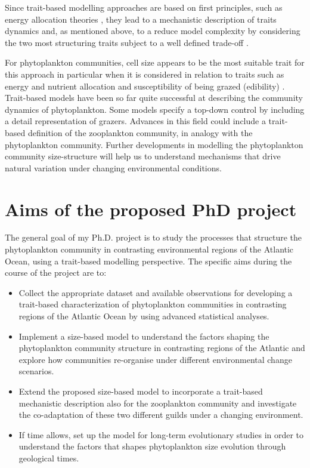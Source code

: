 Since trait-based modelling approaches are based on first principles, such as energy allocation theories \citep{Kooijman2009}, they lead to a mechanistic description of traits dynamics and, as mentioned above, to a reduce model complexity by considering the two most structuring traits subject to a well defined trade-off \citep{Merico2009, Follows2011}.

For phytoplankton communities, cell size appears to be the most suitable trait for this approach in particular when it is considered in relation to traits such as energy and nutrient allocation and susceptibility of being grazed (edibility) \citep{Litchman2008,Follows2011, Merico2009}. Trait-based models \citep{Bruggeman2007, Merico2009} have been so far quite successful at describing the community dynamics of phytoplankton. Some models specify a top-down control by including a detail representation of grazers. Advances in this field could include a trait-based definition of the zooplankton community, in analogy with the phytoplankton community. Further developments in modelling the phytoplankton community size-structure will help us to understand mechanisms that drive natural variation under changing environmental conditions.


\section{Aims of the proposed PhD project}
The general goal of my Ph.D. project is to study the processes that structure the phytoplankton community in contrasting environmental regions of the Atlantic Ocean, using a trait-based modelling perspective. The specific aims during the course of the project are to:

\begin{itemize}
\item Collect the appropriate dataset and available observations for developing a trait-based characterization of phytoplankton communities in contrasting regions of the Atlantic Ocean by using advanced statistical analyses. 
\item Implement a size-based model to understand the factors shaping the phytoplankton community structure in contrasting regions of the Atlantic and explore how communities re-organise under different environmental change scenarios.
\item Extend the proposed size-based model to incorporate a trait-based mechanistic description also for the zooplankton community and investigate the co-adaptation of these two different guilds under a changing environment.
\item If time allows, set up the model for long-term evolutionary studies in order to understand the factors that shapes phytoplankton size evolution through geological times.
\end{itemize}
